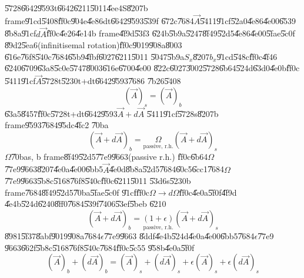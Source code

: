 \documentclass[12pt]{article}
\begin{document}
\bigskip \U{5728}\U{6642}\U{9593}t\U{6642}\U{6211}\U{5011}\U{4ee4}S\U{8207}b
frame\U{91cd}\U{5408}\U{ff0c}\U{904e}\U{4e86}dt\U{6642}\U{9593}\U{539f}%
\U{672c}\U{7684}$\vec{A}$\U{5411}\U{91cf}\U{52a0}\U{4e86}\U{4e00}\U{6539}%
\U{8b8a}\U{91cf}$d\vec{A}$\U{ff0c}\U{4e26}\U{4e14}b frame\U{4f9d}\U{53f3}%
\U{624b}\U{5b9a}\U{5247}\U{8f49}\U{52d5}\U{4e86}\U{4e00}\U{5fae}\U{5c0f}%
\U{89d2}\U{5ea6}(infinitisemal rotation)\U{ff0c}\U{9019}\U{908a}\U{8003}%
\U{616e}\U{76f8}\U{540c}\U{7684}\U{65b9}\U{4fbf}\U{6027}\U{6211}\U{5011}%
\U{5047}\U{5b9a}$S_{x}$\U{8207}$b_{x}$\U{91cd}\U{548c}\U{ff0c}\U{4f46}%
\U{6240}\U{6709}\U{63a8}\U{5c0e}\U{5747}\U{8003}\U{616e}\U{6700}\U{4e00}%
\U{822c}\U{6027}\U{3002}\U{5728}\U{6b64}\U{524d}\U{63d0}\U{4e0b}\U{ff0c}%
\U{5411}\U{91cf}$\vec{A}$\U{5728}t\U{5230}t+dt\U{6642}\U{9593}\U{7686}%
\U{7b26}\U{5408}%
\begin{equation*}
\left( \vec{A}\right) _{s}=\left( \vec{A}\right) _{b}
\end{equation*}%
\U{63a5}\U{8457}\U{ff0c}\U{5728}t+dt\U{6642}\U{9593}$\vec{A}+d\vec{A}$%
\U{5411}\U{91cf}\U{5728}s\U{8207}b frame\U{9593}\U{7684}\U{95dc}\U{4fc2}%
\U{70ba}%
\begin{equation*}
\left( \vec{A}+d\vec{A}\right) _{b}=\underset{\text{passive, r.h.}}{\Omega }%
\left( \vec{A}+d\vec{A}\right) _{s}
\end{equation*}%
$\Omega $\U{70ba}s, b frame\U{8f49}\U{52d5}\U{77e9}\U{9663}(passive r.h.)%
\U{ff0c}\U{6b64}$\Omega $\U{77e9}\U{9663}\U{8207}\U{4e0a}\U{4e00}\U{6bb5}$%
\vec{A}$\U{4e0d}\U{8b8a}\U{52d5}\U{7684}\U{60c5}\U{6cc1}\U{7684}$\Omega $%
\U{77e9}\U{9663}\U{5b8c}\U{5168}\U{76f8}\U{540c}\U{ff0c}\U{6211}\U{5011}%
\U{53d6}s\U{5230}b frame\U{7684}\U{8f49}\U{52d5}\U{70ba}\U{5fae}\U{5c0f}%
\U{91cf}\U{ff0c}$\Omega \rightarrow d\Omega $\U{ff0c}\U{4e0a}\U{5f0f}\U{4f9d}%
\U{4e4b}\U{524d}\U{6240}\U{8ff0}\U{7684}\U{539f}\U{7406}\U{53ef}\U{5beb}%
\U{6210}%
\begin{equation*}
\left( \vec{A}+d\vec{A}\right) _{b}=\underset{\text{passive, r.h.}}{\left(
1+\epsilon \right) }\left( \vec{A}+d\vec{A}\right) _{s}
\end{equation*}%
\U{8981}\U{5f37}\U{8abf}\U{9019}\U{908a}\U{7684}$\epsilon $\U{77e9}\U{9663}%
\U{8ddf}\U{4e4b}\U{524d}\U{4e0a}\U{4e00}\U{6bb5}\U{7684}$\epsilon $\U{77e9}%
\U{9663}\U{662f}\U{5b8c}\U{5168}\U{76f8}\U{540c}\U{7684}\U{ff0c}\U{5c55}%
\U{958b}\U{4e0a}\U{5f0f}%
\begin{equation*}
\left( \vec{A}\right) _{b}+\left( d\vec{A}\right) _{b}=\left( \vec{A}\right)
_{s}+\left( d\vec{A}\right) _{s}+\epsilon \left( \vec{A}\right)
_{s}+\epsilon \left( d\vec{A}\right) _{s}
\end{equation*}%
\end{document}
